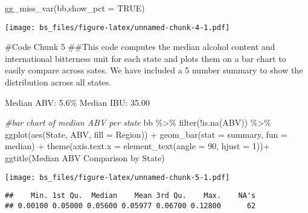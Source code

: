 \documentclass[
]{article}
\newenvironment{Shaded}{\begin{snugshade}}{\end{snugshade}}
\newcommand{\AttributeTok}[1]{\textcolor[rgb]{0.77,0.63,0.00}{#1}}
\newcommand{\CommentTok}[1]{\textcolor[rgb]{0.56,0.35,0.01}{\textit{#1}}}
\newcommand{\ConstantTok}[1]{\textcolor[rgb]{0.00,0.00,0.00}{#1}}
\newcommand{\DecValTok}[1]{\textcolor[rgb]{0.00,0.00,0.81}{#1}}
\newcommand{\FunctionTok}[1]{\textcolor[rgb]{0.00,0.00,0.00}{#1}}
\newcommand{\NormalTok}[1]{#1}
\newcommand{\SpecialCharTok}[1]{\textcolor[rgb]{0.00,0.00,0.00}{#1}}
\newcommand{\StringTok}[1]{\textcolor[rgb]{0.31,0.60,0.02}{#1}}
\begin{document}
\begin{Shaded}
\begin{Highlighting}[]
\FunctionTok{gg\_miss\_var}\NormalTok{(bb,}\AttributeTok{show\_pct =} \ConstantTok{TRUE}\NormalTok{)}
\end{Highlighting}
\end{Shaded}

\texttt{[image: bs\_files/figure-latex/unnamed-chunk-4-1.pdf]}

\#Code Chunk 5 \#\#This code computes the median alcohol content and
international bitterness unit for each state and plots them on a bar
chart to easily compare across sates. We have included a 5 number
summary to show the distribution across all states.

Median ABV: 5.6\% Median IBU: 35.00

\begin{Shaded}
\begin{Highlighting}[]
\CommentTok{\#bar chart of median ABV per state}
\NormalTok{bb }\SpecialCharTok{\%\textgreater{}\%} \FunctionTok{filter}\NormalTok{(}\SpecialCharTok{!}\FunctionTok{is.na}\NormalTok{(ABV)) }\SpecialCharTok{\%\textgreater{}\%}
   \FunctionTok{ggplot}\NormalTok{(}\FunctionTok{aes}\NormalTok{(State, ABV, }\AttributeTok{fill =}\NormalTok{ Region)) }\SpecialCharTok{+}
   \FunctionTok{geom\_bar}\NormalTok{(}\AttributeTok{stat =} \StringTok{\textquotesingle{}summary\textquotesingle{}}\NormalTok{, }\AttributeTok{fun =} \StringTok{\textquotesingle{}median\textquotesingle{}}\NormalTok{) }\SpecialCharTok{+}
   \FunctionTok{theme}\NormalTok{(}\AttributeTok{axis.text.x =} \FunctionTok{element\_text}\NormalTok{(}\AttributeTok{angle =} \DecValTok{90}\NormalTok{, }\AttributeTok{hjust =} \DecValTok{1}\NormalTok{))}\SpecialCharTok{+}
   \FunctionTok{ggtitle}\NormalTok{(}\StringTok{\textquotesingle{}Median ABV Comparison by State\textquotesingle{}}\NormalTok{)}
\end{Highlighting}
\end{Shaded}

\texttt{[image: bs\_files/figure-latex/unnamed-chunk-5-1.pdf]}

\begin{Shaded}
\end{Shaded}

\begin{verbatim}
##    Min. 1st Qu.  Median    Mean 3rd Qu.    Max.    NA's 
## 0.00100 0.05000 0.05600 0.05977 0.06700 0.12800      62
\end{verbatim}
\end{document}
